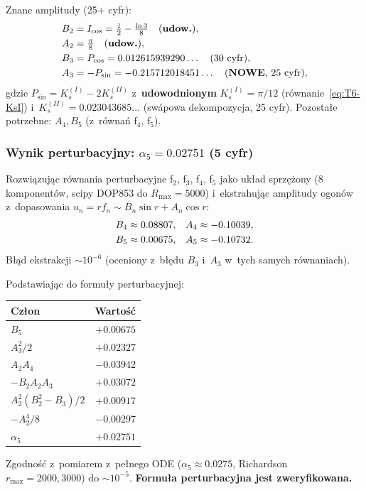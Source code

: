 \medskip\noindent Znane amplitudy (25+ cyfr):
\begin{align}
  B_2 &= I_{\cos} = \tfrac{1}{2} - \tfrac{\ln 3}{8} \quad \text{(\textbf{udow.})}, \notag \\
  A_2 &= \tfrac{\pi}{8} \quad \text{(\textbf{udow.})}, \notag \\
  B_3 &= P_{\cos} = 0.012615939290\ldots \quad \text{(30 cyfr)}, \notag \\
  A_3 &= -P_{\sin} = -0.215712018451\ldots \quad \text{(\textbf{NOWE}, 25 cyfr)}, \notag
\end{align}
gdzie $P_{\sin} = K_s^{(I)} - 2 K_s^{(II)}$ z~\textbf{udowodnionym}
$K_s^{(I)} = \pi/12$ (r\'ownanie~\eqref{eq:T6-KsI}) i~$K_s^{(II)} = 0.023043685\ldots$
(sw\'apowa dekompozycja, 25 cyfr).
Pozosta\l{}e potrzebne: $A_4, B_5$ (z~r\'owna\'n f$_4$, f$_5$).

\subsubsection*{Wynik perturbacyjny: $\alpha_5 = 0.02751$ (\textbf{5 cyfr})}

Rozwi\k{a}zuj\k{a}c r\'ownania perturbacyjne f$_2$, f$_3$, f$_4$, f$_5$
jako uk\l{}ad sprz\k{e}\.zony (8 komponent\'ow, scipy DOP853 do $R_{\max} = 5000$)
i~ekstrahuj\k{a}c amplitudy ogon\'ow z~dopasowania $u_n = r f_n \sim B_n\sin r + A_n\cos r$:
\begin{align}
  B_4 &\approx 0.08807, & A_4 &\approx -0.10039, \notag \\
  B_5 &\approx 0.00675, & A_5 &\approx -0.10732. \notag
\end{align}
B\l{}\k{a}d ekstrakcji $\sim 10^{-6}$ (oceniony z~b\l{}\k{e}du $B_3$ i~$A_3$ w~tych samych
r\'ownaniach).

\medskip\noindent Podstawiaj\k{a}c do formu\l{}y perturbacyjnej:
\begin{center}
\begin{tabular}{lr}
\hline
Cz\l{}on & Warto\'s\'c \\
\hline
$B_5$                         & $+0.00675$ \\
$A_3^2/2$                     & $+0.02327$ \\
$A_2 A_4$                     & $-0.03942$ \\
$-B_2 A_2 A_3$                & $+0.03072$ \\
$A_2^2(B_2^2 - B_3)/2$        & $+0.00917$ \\
$-A_2^4/8$                    & $-0.00297$ \\
\hline
$\alpha_5$                    & $\mathbf{+0.02751}$ \\
\hline
\end{tabular}
\end{center}
Zgodno\'s\'c z~pomiarem z~pe\l{}nego ODE ($\alpha_5 \approx 0.0275$, Richardson
$r_{\max} = 2000, 3000$) do $\sim 10^{-5}$. \textbf{Formu\l{}a perturbacyjna jest zweryfikowana.}

